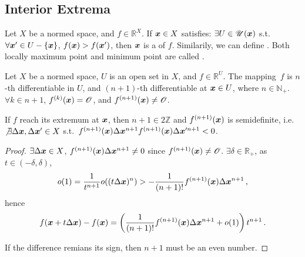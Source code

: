 \documentclass[openany]{book}
\begin{document}
\subsection{Interior Extrema}

\begin{definition}[Extremum]
	Let $X$ be a normed space, and $f \in \mathbb R^X$. 
	If $\boldsymbol{x} \in X$ satisfies: $\exists U \in \mathscr U(\boldsymbol{x})$ s.t.\ 
	$\forall \boldsymbol{x}' \in U - \{\boldsymbol{x}\}$, $f(\boldsymbol{x}) > f(\boldsymbol{x}')$, then $\boldsymbol{x}$ is a  of $f$.
	Similarily, we can define \indexbf{locally minimun point}. Both locally maximum point and minimum point are called .
\end{definition}

\begin{theorem}
	\label{theorem: interior extremum}
	Let $X$ be a normed space, $U$ is an open set in $X$, and $f \in \mathbb R^U$.
	The mapping~$f$ is $n$-th differentiable in $U$, and $(n + 1)$-th differentiable at $\boldsymbol{x} \in U$, where $n \in \mathbb N_+$.
	$\forall k \in n + 1$, $f^{(k)}(\boldsymbol{x}) = \mathscr O$, and $f^{(n + 1)}(\boldsymbol{x}) \neq \mathscr O$.

	If $f$ reach its extremum at $\boldsymbol{x}$, then $n + 1 \in 2\mathbb Z$ and $f^{(n + 1)}(\boldsymbol{x})$ is semidefinite, i.e.\ $\not\exists \Delta \boldsymbol{x}, \Delta \boldsymbol{x}' \in X$ s.t.\ $f^{(n + 1)}(\boldsymbol{x}) \Delta \boldsymbol{x}^{n+1} f^{(n + 1)}(\boldsymbol{x}) \Delta \boldsymbol{x}'^{n+1} < 0$.
\end{theorem}
\begin{proof}
	$\exists \Delta \boldsymbol{x} \in X$, $f^{(n + 1)}(\boldsymbol{x})\Delta \boldsymbol{x}^{n+1} \neq 0$ since $f^{(n + 1)}(\boldsymbol{x}) \neq \mathscr O$. $\exists \delta \in \mathbb R_+$, as $t \in (-\delta, \delta)$, 
	\begin{equation*}
		o(1) = \frac{1}{t^{n +1}} o((t\Delta \boldsymbol{x})^n)  > -\frac{1}{(n+1)!} f^{(n + 1)}(\boldsymbol{x}) \Delta \boldsymbol{x}^{n+1}\,,
	\end{equation*} 
	hence
	\begin{equation*}
		f(\boldsymbol{x} + t \Delta \boldsymbol{x}) - f(\boldsymbol{x}) = \left( 
			\frac{1}{(n+1)!} f^{(n + 1)}(\boldsymbol{x}) \Delta \boldsymbol{x}^{n+1} + o(1)
		 \right)t^{n + 1}\,.
	\end{equation*}

	If the difference remians its sign, then $n + 1$ must be an even number.
\end{proof}
\end{document}
